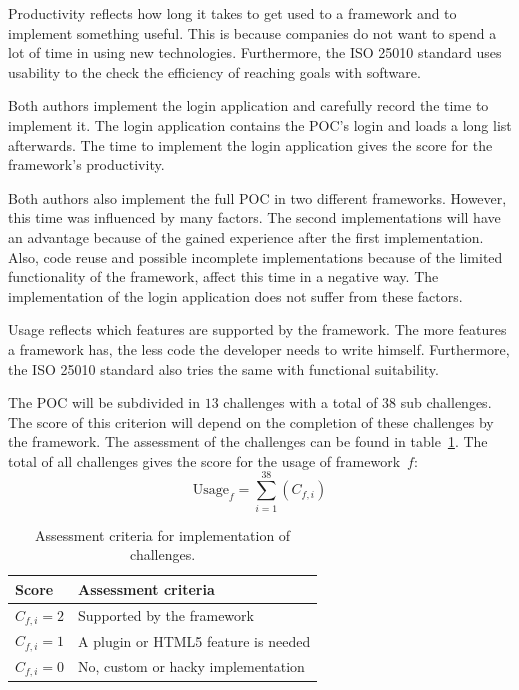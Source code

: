 \documentclass[a4paper]{artikel3}
\newcommand{\setspace}[0]{\vspace{2mm}}
\renewcommand{\paragraph}[1]{\setspace \noindent {\bf #1}  }
\begin{document}
\paragraph{Productivity}
Productivity reflects how long it takes to get used to a framework and to implement something useful.
This is because companies do not want to spend a lot of time in using new technologies.
Furthermore, the ISO 25010 standard uses usability to the check the efficiency of reaching goals with software.

Both authors implement the login application and carefully record the time to implement it. 
The login application contains the POC's login and loads a long list afterwards.
The time to implement the login application gives the score for the framework's productivity. 

Both authors also implement the full POC in two different frameworks.
However,  this time was influenced by many factors.
The second implementations will have an advantage because of the gained experience after the first implementation.
Also,  code reuse and possible incomplete implementations because of the limited functionality of the framework, affect this time in a negative way.
The implementation of the login application does not suffer from these factors.

\paragraph{Usage}
Usage reflects which features are supported by the framework.
The more features a framework has, the less code the developer needs to write himself.
Furthermore, the ISO 25010 standard also tries the same with functional suitability.

The POC will be subdivided in $13$ challenges with a total of $38$ sub challenges.  
The score of this criterion will depend on the completion of these challenges by the framework.  
The assessment of the challenges can be found in table~\ref{table:challenges-scores}.  
The total of all challenges gives the score for the usage of framework~$f$:
\begin{equation}
  \text{Usage}_f = \sum_{i=1}^{38}{\left(C_{f,i}\right)}
  \label{eq:gebruik}
\end{equation}

\begin{table}	
\centering
\begin{tabular}{ll}
\toprule
\textbf{Score} & \textbf{Assessment criteria}\\
\midrule
$C_{f,i} = 2$ & Supported by the framework\\
$C_{f,i} = 1$ & A plugin or HTML5 feature is needed\\
$C_{f,i} = 0$ & No, custom or hacky implementation\\
\bottomrule
\end{tabular}
\caption{Assessment criteria for implementation of challenges.}
\label{table:challenges-scores}
\end{table}
\end{document}
